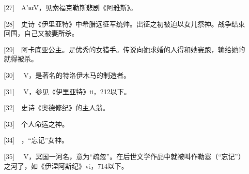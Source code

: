 \documentclass[12pt,oneside]{book}
\begin{document}
[27]　A’ιαV，见索福克勒斯悲剧《阿雅斯》。

[28]　史诗《伊里亚特》中希腊远征军统帅。出征之初被迫以女儿祭神。战争结束回国，自己又被妻所杀。

[29]　阿卡底亚公主。是优秀的女猎手。传说向她求婚的人得和她赛跑，输给她的就得被杀。

[30]　 V，是著名的特洛伊木马的制造者。

[31]　 V，参见《伊里亚特》ii，212以下。

[32]　史诗《奥德修纪》的主人翁。

[33]　个人命运之神。

[34]　，“忘记”女神。

[35]　 V，冥国一河名，意为“疏忽”。在后世文学作品中就被叫作勒塞（“忘记”）之河了，如《伊涅阿斯纪》vi，714以下。











\end{document}
